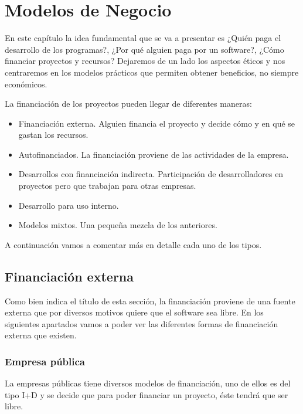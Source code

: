 \chapter{Modelos de Negocio}
\label{CHAP3:Economy}

En este capítulo la idea fundamental que se va a presentar es ¿Quién paga el
desarrollo de los programas?, ¿Por qué alguien paga por un software?, ¿Cómo
financiar proyectos y recursos?
Dejaremos de un lado los aspectos éticos y nos centraremos en los
modelos prácticos que permiten obtener beneficios, no siempre
económicos.

La financiación de los proyectos pueden llegar de diferentes maneras:

\begin{itemize}
  \item Financiación externa. Alguien financia el proyecto y decide cómo y en
  qué se gastan los recursos.
  \item Autofinanciados. La financiación proviene de las actividades de la
  empresa.
  \item Desarrollos con financiación indirecta. Participación de desarrolladores
  en proyectos pero que trabajan para otras empresas.
  \item Desarrollo para uso interno.
  \item Modelos mixtos. Una pequeña mezcla de los anteriores.
\end{itemize}

A continuación vamos a comentar más en detalle cada uno de los tipos.


\section{Financiación externa}

Como bien indica el título de esta sección, la financiación proviene de una fuente externa
que por diversos motivos quiere que el software sea libre. En los siguientes
apartados vamos a poder ver las diferentes formas de financiación externa que
existen.

\subsection{Empresa pública}


La empresas públicas tiene diversos modelos de financiación, uno de ellos es
del tipo I+D y se decide que para poder financiar un proyecto, éste tendrá que
ser libre.

